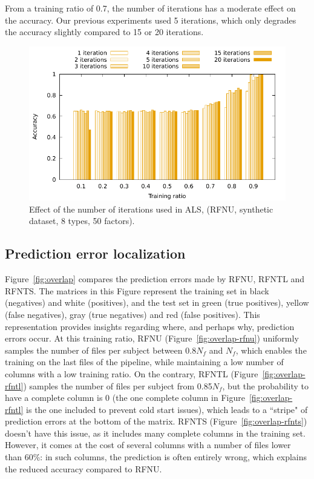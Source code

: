 \documentclass[10pt, conference, compsocconf]{IEEEtran}
\begin{document}
From a training ratio of 0.7, the number of iterations has a moderate 
effect on the accuracy. Our previous experiments used 5 iterations, 
which only degrades the accuracy slightly compared to 15 or 20 iterations.

\begin{figure}[h]
\includegraphics[width=0.9\columnwidth]{data/results/means_of_results/ALS/Synthetic/8type-RFNU-Differ-Num-Iterations-rank50/ALS-8-types-iteration.pdf}
\caption{Effect of the number of iterations used in ALS, (RFNU, synthetic dataset, 8 types, 50 factors).}
\label{fig:iterations}
\end{figure}

\subsection{Prediction error localization}

Figure~\ref{fig:overlap} compares the prediction errors made by RFNU, 
RFNTL and RFNTS. The matrices in this Figure represent the training set 
in black (negatives) and white (positives), and the test set in green 
(true positives), yellow (false negatives), gray (true negatives) and 
red (false positives). This representation provides insights regarding 
where, and perhaps why, prediction errors 
occur. At this training ratio, RFNU (Figure~\ref{fig:overlap-rfnu}) 
uniformly samples the number of files per subject between 0.8$N_f$ and 
$N_f$, which enables the training on the last 
files of the pipeline, while maintaining a low number of columns with 
a low training ratio. On the contrary, RFNTL 
(Figure~\ref{fig:overlap-rfntl}) samples the number of files per 
subject from 0.85$N_f$, but the probability to have a complete column 
is 0 (the one complete column in Figure~\ref{fig:overlap-rfntl} is the 
one included to prevent cold start issues), which leads to a ``stripe" 
of prediction errors at the bottom of the matrix. RFNTS 
(Figure~\ref{fig:overlap-rfnts}) doesn't have this issue, as it 
includes many complete columns in the training set. However, it comes at 
the cost of several columns with a number of files lower than 
60\%: in such columns, the prediction is often entirely wrong, which explains
the reduced accuracy compared to RFNU.
\end{document}
